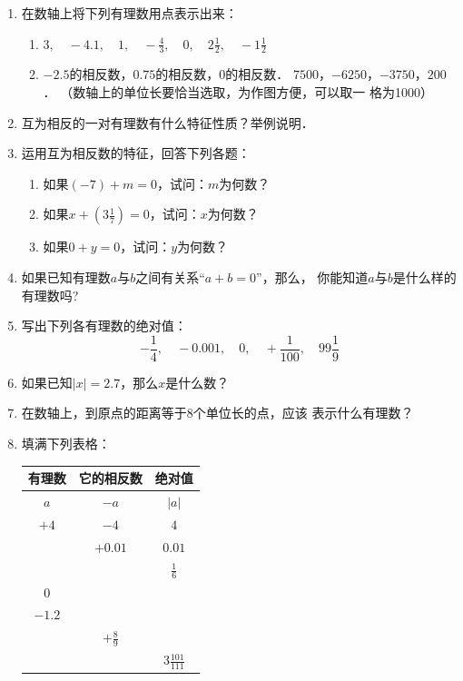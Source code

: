 \begin{enumerate}
	
	\item 在数轴上将下列有理数用点表示出来：
	\begin{enumerate}
		\item $3,\quad -4.1,\quad 1,\quad -\frac{4}{3},\quad 0,\quad 2\frac{1}{2},\quad -1\frac{1}{2}$
		\item $-2.5$的相反数，$0.75$的相反数，0的相反数．
		\staritem $7500$，$-6250$，$-3750$，$200$．
		（数轴上的单位长要恰当选取，为作图方便，可以取一
		格为1000）
	\end{enumerate}
	
	
	\item 互为相反的一对有理数有什么特征性质？举例说明．
	\item 运用互为相反数的特征，回答下列各题：
	\begin{enumerate}
		\item 如果$(-7) +m=0$，试问：$m$为何数？
		\item 如果$x+\left(3\frac{1}{7}\right)=0$，试问：$x$为何数？
		\item 如果$0+y=0$，试问：$y$为何数？
	\end{enumerate}
	
	
	\item 如果已知有理数$a$与$b$之间有关系“$a+b=0$”，那么，
	你能知道$a$与$b$是什么样的有理数吗?
	\item 写出下列各有理数的绝对值：
	\[-\frac{1}{4},\quad -0.001,\quad 0,\quad +\frac{1}{100},\quad 99\frac{1}{9}\]
	
	\item 如果已知$|x|= 2.7$，那么$x$是什么数？
	\item 在数轴上，到原点的距离等于8个单位长的点，应该
	表示什么有理数？
	\item 填满下列表格：
	\begin{center}
		\begin{tabular}{ccc}
			\hline
			有理数&它的相反数&绝对值\\
			\hline
			$a$  &   $-a$   &   $|a|$\\ 
			$+4$  &   $-4$   &   $4$\\ 
			&   $+0.01$   &   $0.01$\\ 
			&      &   $\frac{1}{6}$\\ 
			$0$  &      &   \\ 
			$-1.2$  &      &   \\ 
			&   $+\frac{8}{9}$   &   \\ 
			&      &   $3\frac{101}{111}$\\ 
			\hline
		\end{tabular}
	\end{center}
	

\end{enumerate}
